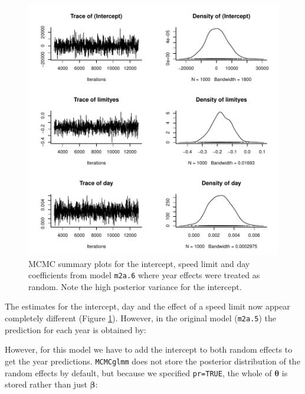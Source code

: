 \documentclass{article}
\begin{document}
\begin{figure}[!h]
\begin{center}
\includegraphics{Lecture2-046}
\end{center}
\caption{MCMC summary plots for the intercept, speed limit and day coefficients from model \texttt{m2a.6} where year effects were treated as random. Note the high posterior variance for the intercept.}
\label{yrandom-fig}
\end{figure}

The estimates for the intercept, day and the effect of a speed limit now appear completely different (Figure \ref{yrandom-fig}).  However, in the original model (\texttt{m2a.5}) the prediction for each year is obtained by:

\begin{Schunk}
\end{Schunk}

However, for this model we have to add the intercept to both random effects to get the year predictions. \texttt{MCMCglmm} does not store the posterior distribution of the random effects by default, but because we specified \texttt{pr=TRUE}, the whole of ${\bm \theta}$ is stored rather than just ${\bm \beta}$:  
\end{document}
